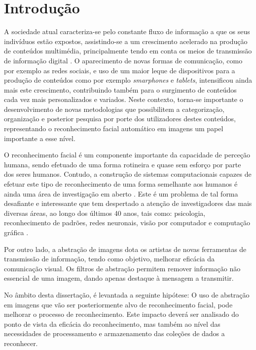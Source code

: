 \chapter{Introdução} \label{chap:intro}

A sociedade atual caracteriza-se pelo constante fluxo de informação a que os seus indivíduos estão expostos, assistindo-se a um crescimento acelerado na produção de conteúdos multimédia, principalmente tendo em conta os meios de transmissão de informação digital \citep{IntelCorporation}. O aparecimento de novas formas de comunicação, como por exemplo as redes sociais, e uso de um maior leque de dispositivos para a produção de conteúdos como por exemplo \textit{smarphones} e \textit{tablets}, intensificou ainda mais este crescimento, contribuindo também para o surgimento de conteúdos cada vez mais personalizados e variados. Neste contexto, torna-se importante o desenvolvimento de novas metodologias que possibilitem a categorização, organização e posterior pesquisa por porte dos utilizadores destes conteúdos, representando o reconhecimento facial automático em imagens um papel importante a esse nível.

O reconhecimento facial é um componente importante da capacidade de perceção humana, sendo efetuado de uma forma rotineira e quase sem esforço por parte dos seres humanos. Contudo, a construção de sistemas computacionais capazes de efetuar este tipo de reconhecimento de uma forma semelhante aos humanos é ainda uma área de investigação em aberto \citep{Li2011}. Este é um problema de tal forma desafiante e interessante que tem despertado a atenção de investigadores das mais diversas áreas, ao longo dos últimos 40 anos, tais como: psicologia, reconhecimento de padrões, redes neuronais, visão por computador e computação gráfica \citep{Zhao2003}.

Por outro lado, a abstração de imagens dota os artistas de novas ferramentas de transmissão de informação, tendo como objetivo, melhorar eficácia da comunicação visual. Os filtros de abstração permitem remover informação não essencial de uma imagem, dando apenas destaque à mensagem a transmitir. 

No âmbito desta dissertação, é levantada a seguinte hipótese: O uso de abstração em imagens que vão ser posteriormente alvo de reconhecimento facial, pode melhorar o processo de reconhecimento. Este impacto deverá ser analisado do ponto de vista da eficácia do reconhecimento, mas também ao nível das necessidades de processamento e armazenamento das coleções de dados a reconhecer.

